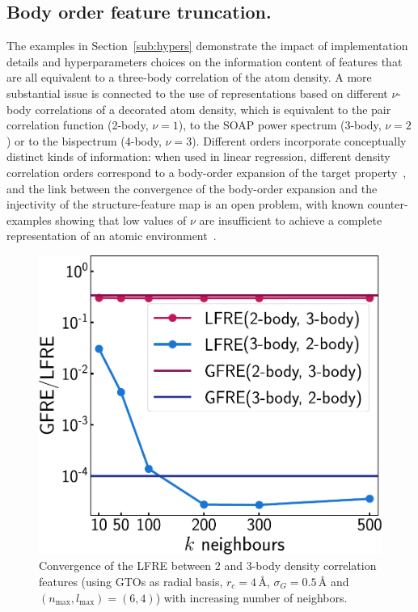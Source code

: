 \subsection{ Body order feature truncation. }

The examples in Section~\ref{sub:hypers} demonstrate the impact of implementation details and hyperparameters choices on the information content of features that are all equivalent to a three-body correlation of the atom density. A more substantial issue is connected to the use of representations based on different $\nu$-body correlations of a decorated atom density, which is equivalent to the pair correlation function (2-body, $\nu=1$), to the SOAP power spectrum (3-body, $\nu=2$) or to the bispectrum (4-body, $\nu=3$).
Different orders incorporate conceptually distinct kinds of information: when used in linear regression, different density correlation orders correspond to a body-order expansion of the target property~\cite{shapeev2016moment,glie+18prb,will+19jcp,drau19prb,jinn+20jcp}, and the link between the convergence of the body-order expansion and the injectivity of the structure-feature map is an open problem, with known counter-examples showing that low values of $\nu$ are insufficient to achieve a complete representation of an atomic environment~\cite{pozd+20prl}.

\begin{figure}
    \centering
    \includegraphics[width=0.5\linewidth]{fig/rof/lfre_convergence_comparison-methane-inkscaped-v3.pdf}
    \caption{Convergence of the LFRE between 2 and 3-body density correlation features (using GTOs as radial basis, $r_c= 4\,$\AA{}, $\sigma_G=0.5\,$\AA{} and $(n_\text{max},l_\text{max})=(6,4)$) with increasing number of neighbors.}
    \label{fig:soap-lfre-convergence}
\end{figure}


